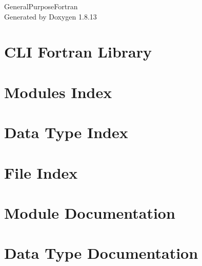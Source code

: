 \documentclass[twoside]{book}
\newcommand{\+}{\discretionary{\mbox{\scriptsize$\hookleftarrow$}}{}{}}
\newcommand{\clearemptydoublepage}{%
  \newpage{\pagestyle{empty}\cleardoublepage}%
}
\begin{document}
\hypersetup{pageanchor=false,
             bookmarksnumbered=true,
             pdfencoding=unicode
            }
\begin{titlepage}
\vspace*{7cm}
\begin{center}%
{\Large General\+Purpose\+Fortran }\\
\vspace*{1cm}
{\large Generated by Doxygen 1.8.13}\\
\end{center}
\end{titlepage}
\clearemptydoublepage
{}
\tableofcontents
\clearemptydoublepage
{}
\hypersetup{pageanchor=true}

\chapter{C\+LI Fortran Library}
\label{index}\hypertarget{index}{}
\chapter{Modules Index}

\chapter{Data Type Index}

\chapter{File Index}

\chapter{Module Documentation}


\chapter{Data Type Documentation}

\end{document}
